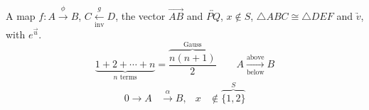 \documentclass{article}
\begin{document}
A map $f\colon A \xrightarrow{\ \phi\ } B$, $C \xleftarrow[\text{inv}]{g} D$, the vector $\overrightarrow{AB}$ and $\overleftrightarrow{PQ}$,
$x \notin S$, $\triangle ABC \cong \triangle DEF$ and $\underrightarrow{v}$, with $e^{\overrightarrow{u}}$.
\[ \underbrace{1 + 2 + \cdots + n}_{n \text{ terms}} = \overbrace{\frac{n(n+1)}{2}}^{\text{Gauss}} \qquad A \xrightarrow[\text{below}]{\text{above}} B \]
\begin{align}
  0 \xrightarrow{} A &\xrightarrow{\alpha} B, & x &\notin \overbrace{\{1,2\}}^{S}
\end{align}
\end{document}
